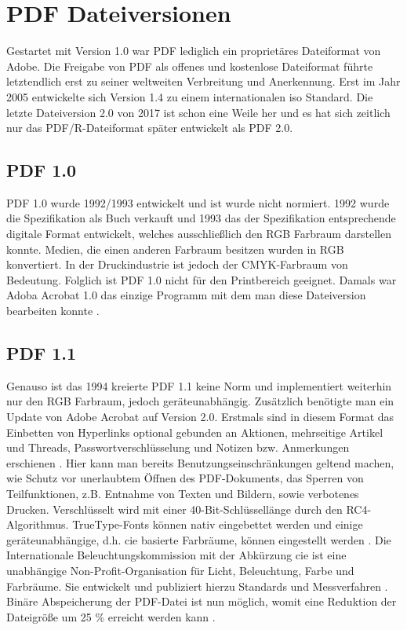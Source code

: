 \section{PDF Dateiversionen}
Gestartet mit Version 1.0 war PDF lediglich ein proprietäres Dateiformat von Adobe. Die Freigabe von PDF als offenes und kostenlose Dateiformat führte letztendlich erst zu seiner weltweiten Verbreitung und Anerkennung. Erst im Jahr 2005 entwickelte sich Version 1.4 zu einem internationalen \gls{iso} Standard. Die letzte Dateiversion 2.0 von 2017 ist schon eine Weile her und es hat sich zeitlich nur das PDF/R-Dateiformat später entwickelt als PDF 2.0.

\subsection{PDF 1.0}
PDF 1.0 wurde 1992/1993 entwickelt und ist wurde nicht normiert. 1992 wurde die Spezifikation als Buch verkauft und 1993 das der Spezifikation entsprechende digitale Format entwickelt, welches ausschließlich den RGB Farbraum darstellen konnte. Medien, die einen anderen Farbraum besitzen wurden in RGB konvertiert. In der Druckindustrie ist jedoch der CMYK-Farbraum von Bedeutung. Folglich ist PDF 1.0 nicht für den Printbereich geeignet. Damals war Adoba Acrobat 1.0 das einzige Programm mit dem man diese Dateiversion bearbeiten konnte \cite{proj-consult}. 

\subsection{PDF 1.1}
Genauso ist das 1994 kreierte PDF 1.1 keine Norm und implementiert weiterhin nur den RGB Farbraum, jedoch geräteunabhängig. Zusätzlich benötigte man ein Update von Adobe Acrobat auf Version 2.0. Erstmals sind in diesem Format das Einbetten von Hyperlinks optional gebunden an Aktionen, mehrseitige Artikel und Threads, Passwortverschlüsselung und Notizen bzw. Anmerkungen erschienen \cite{proj-consult}. Hier kann man bereits Benutzungseinschränkungen geltend machen, wie Schutz vor unerlaubtem Öffnen des PDF-Dokuments, das Sperren von Teilfunktionen, z.B. Entnahme von Texten und Bildern, sowie verbotenes Drucken. Verschlüsselt wird mit einer 40-Bit-Schlüssellänge durch den RC4-Algorithmus. TrueType-Fonts können nativ eingebettet werden und einige geräteunabhängige, d.h. \gls{cie} basierte Farbräume, können eingestellt werden \cite{schneeberger}. Die Internationale Beleuchtungskommission mit der Abkürzung \gls{cie} ist eine unabhängige Non-Profit-Organisation für Licht, Beleuchtung, Farbe und Farbräume. Sie entwickelt und publiziert hierzu Standards und Messverfahren \cite{wiki-cie-de, wiki-cie-engl}.
Binäre Abspeicherung der PDF-Datei ist nun möglich, womit eine Reduktion der Dateigröße um 25 \% erreicht werden kann \cite{schneeberger}.

